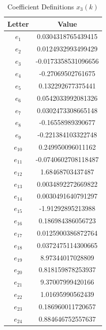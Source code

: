 \begin{table}[H]
\centering
\caption{Coefficient Definitions $x_{3}(k)$}
\label{tab:coefficients3}
\begin{tabular}{|c|c|}
\hline
\textbf{Letter} & \textbf{Value} \\
\hline
$e_1$ & 0.0304318765439415 \\
$e_2$ & 0.0124932993499429 \\
$e_3$ & -0.0173358531096656 \\
$e_4$ & -0.27069502761675 \\
$e_5$ & 0.132292677375441 \\
$e_6$ & 0.0542033992081326 \\
$e_7$ & 0.0302473308665148 \\
$e_8$ & -0.16558989390677 \\
$e_9$ & -0.221384103322748 \\
$e_{10}$ & 0.249950096011162 \\
$e_{11}$ & -0.0740602708118487 \\
$e_{12}$ & 1.68468703437487 \\
$e_{13}$ & 0.0034892272669822 \\
$e_{14}$ & 0.0030491640791297 \\
$e_{15}$ & -1.91292895213988 \\
$e_{16}$ & 0.186984386056723 \\
$e_{17}$ & 0.0125900386872764 \\
$e_{18}$ & 0.0372475114300665 \\
$e_{19}$ & 8.97344017028809 \\
$e_{20}$ & 0.818159878253937 \\
$e_{21}$ & 9.37007999420166 \\
$e_{22}$ & 1.01695990562439 \\
$e_{23}$ & 0.186960011720657 \\
$e_{24}$ & 0.884646752557637 \\
\hline
\end{tabular}
\end{table}

